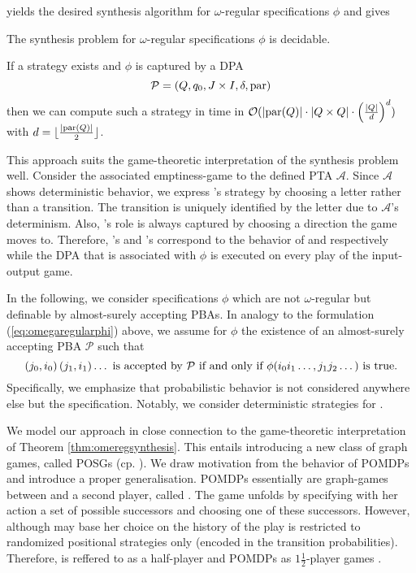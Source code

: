 yields the desired synthesis algorithm for $\omega$-regular specifications
$\phi$ and gives
\begin{theorem}
  \cite[Theorem 21, Theorem 22]{AutoInfObj}
  The synthesis problem for $\omega$-regular specifications $\phi$ is
  decidable.

  If a strategy exists and $\phi$ is captured by a \ac{DPA}
  \begin{equation*}
    \mathcal{P} = \left(Q, q_{0}, J\times I, \delta, \operatorname{par}\right)
  \end{equation*}
  then we can compute such a strategy in time in 
  $\mathcal{O}(\left\vert{\operatorname{par}(Q)}\right\vert\cdot\left\vert{Q\times Q}\right\vert\cdot\left(
    \frac{\left\vert{Q}\right\vert}{d}\right)^{d})$ with 
  $d = \lfloor \frac{\left\vert{\operatorname{par}(Q)}\right\vert}{2} \rfloor$.
  \label{thm:omeregsynthesis}
\end{theorem}
This approach suits the game-theoretic interpretation of the synthesis problem
well. Consider the associated emptiness-game to the defined \ac{PTA}
$\mathcal{A}$. Since $\mathcal{A}$ shows deterministic behavior, we express
\eve{}'s strategy by choosing a letter rather than a transition. The transition
is uniquely identified by the letter due to $\mathcal{A}$'s determinism. Also,
\adam{}'s role is always captured by choosing a direction the game moves to.
Therefore, \eve{}'s and \adam{}'s correspond to the behavior of \outputp{}
and  respectively while the \ac{DPA} that is associated with $\phi$ is
executed on every play of the input-output game.

In the following, we consider specifications $\phi$ which are not
$\omega$-regular but definable by almost-surely accepting \acp{PBA}. In
analogy to the formulation (\ref{eq:omegaregularphi}) above, we assume for
$\phi$ the existence of an almost-surely accepting \ac{PBA} $\mathcal{P}$
such that
\begin{equation}
  \left(j_{0}, i_{0}\right)\left(j_{1}, i_{1}\right)\dots\text{ is accepted by }
  \mathcal{P} \text{ if and only if }
  \phi(i_{0}i_{1}\dots, j_{1}j_{2}\dots)\text{ is true.}
  \label{eq:pbaregularphi}
\end{equation}
Specifically, we emphasize that probabilistic behavior is not considered
anywhere else but the specification. Notably, we consider deterministic
strategies for \outputp{}.

We model our approach in close connection to the game-theoretic interpretation
of Theorem \ref{thm:omeregsynthesis}. This entails introducing a new class of
graph games, called \acp{POSG} (cp. \cite{POSG, PureStratPOSG}). We draw
motivation from the behavior of \acp{POMDP} and introduce a proper
generalisation. \acp{POMDP} essentially are graph-games between \eve{} and a
second player, called \random{}. The game unfolds by \eve{} specifying with her
action a set of possible successors and \random{} choosing one of these
successors. However, although \eve{} may base her choice on the history of the
play \random{} is restricted to randomized positional strategies only (encoded
in the transition probabilities). Therefore, \random{} is reffered to as a
half-player and \acp{POMDP} as $1\frac{1}{2}$-player games \cite{POSG}.

